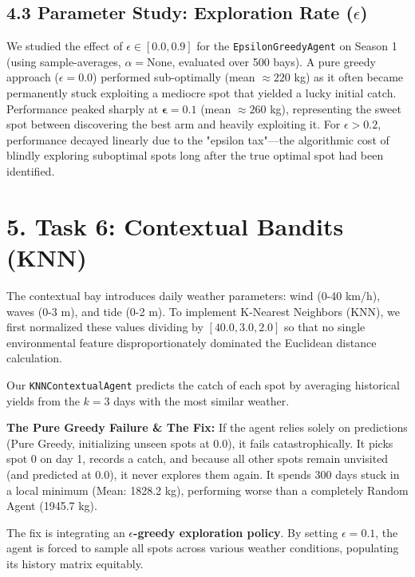 \documentclass[11pt, a4paper]{article}
\begin{document}
\subsection*{4.3 Parameter Study: Exploration Rate ($\epsilon$)}
We studied the effect of $\epsilon \in [0.0, 0.9]$ for the \texttt{EpsilonGreedyAgent} on Season 1 (using sample-averages, $\alpha=\text{None}$, evaluated over 500 bays). A pure greedy approach ($\epsilon=0.0$) performed sub-optimally (mean $\approx 220$ kg) as it often became permanently stuck exploiting a mediocre spot that yielded a lucky initial catch. Performance peaked sharply at $\boldsymbol{\epsilon = 0.1}$ (mean $\approx 260$ kg), representing the sweet spot between discovering the best arm and heavily exploiting it. For $\epsilon > 0.2$, performance decayed linearly due to the "epsilon tax"—the algorithmic cost of blindly exploring suboptimal spots long after the true optimal spot had been identified.

\section*{5. Task 6: Contextual Bandits (KNN)}
The contextual bay introduces daily weather parameters: wind (0-40 km/h), waves (0-3 m), and tide (0-2 m). To implement K-Nearest Neighbors (KNN), we first normalized these values dividing by $[40.0, 3.0, 2.0]$ so that no single environmental feature disproportionately dominated the Euclidean distance calculation. 

Our \texttt{KNNContextualAgent} predicts the catch of each spot by averaging historical yields from the $k=3$ days with the most similar weather.

\textbf{The Pure Greedy Failure \& The Fix:} 
If the agent relies solely on predictions (Pure Greedy, initializing unseen spots at 0.0), it fails catastrophically. It picks spot 0 on day 1, records a catch, and because all other spots remain unvisited (and predicted at 0.0), it never explores them again. It spends 300 days stuck in a local minimum (Mean: 1828.2 kg), performing worse than a completely Random Agent (1945.7 kg).

The fix is integrating an \textbf{$\epsilon$-greedy exploration policy}. By setting $\epsilon = 0.1$, the agent is forced to sample all spots across various weather conditions, populating its history matrix equitably. 
\end{document}
